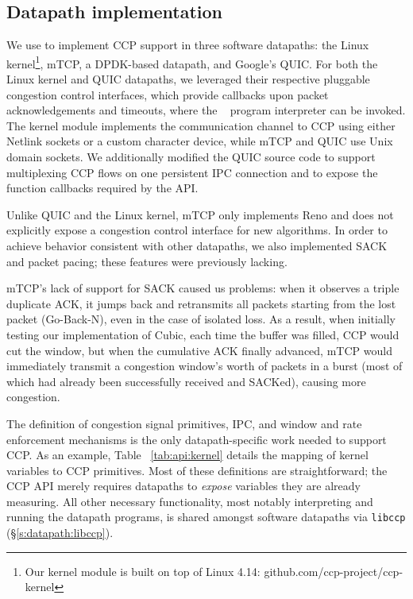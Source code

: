 \subsection{Datapath implementation}
\label{s:datapath:software_datapaths}
We use  to implement CCP support in three software datapaths: the Linux kernel\footnote{Our kernel module is built on top of Linux 4.14: github.com/ccp-project/ccp-kernel}, mTCP, a DPDK-based datapath, and Google's QUIC.
For both the Linux kernel and QUIC datapaths, we leveraged their respective pluggable congestion control interfaces, which provide callbacks upon packet acknowledgements and timeouts, where the ~ program interpreter can be invoked.
The kernel module implements the communication channel to CCP using either Netlink sockets or a custom
character device, while mTCP and QUIC use Unix domain sockets.
We additionally modified the QUIC source code to support multiplexing CCP flows on one persistent IPC connection and to expose the function callbacks required by the  API.

Unlike QUIC and the Linux kernel, mTCP only implements Reno and does not explicitly expose a congestion control interface for new algorithms. 
In order to achieve behavior consistent with other datapaths, we also implemented SACK and packet pacing; these features were previously lacking.

mTCP's lack of support for SACK caused us problems: when it observes a triple duplicate ACK, 
it jumps back and retransmits all packets starting from the lost packet (\ie Go-Back-N), even in the case of isolated loss.
As a result, when initially testing our implementation of Cubic, each time the buffer was filled, CCP
would cut the window, but when the cumulative ACK finally advanced, mTCP would immediately transmit a congestion window’s worth of packets in a burst (most of which had already been successfully received and SACKed), causing more congestion.

The definition of congestion signal primitives, IPC, and window and rate enforcement mechanisms is the only datapath-specific work needed to support CCP.
As an example, Table ~\ref{tab:api:kernel} details the mapping of kernel variables to CCP primitives.
Most of these definitions are straightforward; the CCP API merely requires datapaths to \textit{expose} variables they are already measuring.
All other necessary functionality, most notably interpreting and running the datapath programs, is shared amongst software datapaths via \texttt{libccp} (\S\ref{s:datapath:libccp}).

